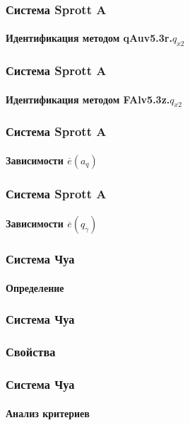 \documentclass[10pt,utf8]{beamer}
\begin{document}

\begin{frame}
  \frametitle{Система Sprott A}
  \framesubtitle{Идентификация методом qAuv5.3r.$q_{x2}$}


\end{frame}



\begin{frame}
  \frametitle{Система Sprott A}
  \framesubtitle{Идентификация методом FAlv5.3z.$q_{x2}$}


\end{frame}




\begin{frame}
  \frametitle{Система Sprott A}
  \framesubtitle{Зависимости $\overline{e}(a_q)$}


\end{frame}



\begin{frame}
  \frametitle{Система Sprott A}
  \framesubtitle{Зависимости $\overline{e}(q_\gamma)$}


\end{frame}

\begin{frame}
  \frametitle{Система Чуа}
  \framesubtitle{Определение}


\end{frame}




\begin{frame}
  \frametitle{Система Чуа}
  \frametitle{Свойства}


\end{frame}




\begin{frame}
  \frametitle{Система Чуа}
  \framesubtitle{Анализ критериев}


\end{frame}
\end{document}
